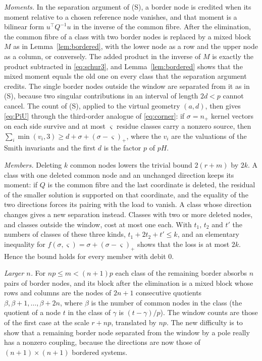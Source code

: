 \documentclass[11pt]{amsart}
\theoremstyle{definition}
\theoremstyle{remark}
\numberwithin{equation}{section}
\begin{document}
\emph{Moments.} In the separation argument of (S), a border node is credited when its moment relative to a chosen
reference node vanishes, and that moment is a bilinear form $u^\top Q^{-1}u$ in the inverse of the common fibre. After the
elimination, the common fibre of a class with two border nodes is replaced by a mixed block $M$ as in
Lemma~\ref{lem:bordered}, with the lower node as a row and the upper node as a column, or conversely. The added product in
the inverse of $M$ is exactly the product subtracted in \eqref{eq:schur3}, and Lemma~\ref{lem:bordered} shows that the
mixed moment equals the old one on every class that the separation argument credits. The single border nodes outside the
window are separated from it as in (S), because two singular contributions in an interval of length $2d<p$ cannot cancel.
The count of (S), applied to the virtual geometry $(a,d)$, then gives \eqref{eq:PiU} through the third-order analogue of
\eqref{eq:corner}: if $\sigma=n_+$ kernel vectors on each side survive and at most $\varsigma$ residue classes carry a
nonzero source, then $\sum_i\min(v_i,3)\ge d+\sigma+(\sigma-\varsigma)_+$, where the $v_i$ are the valuations of the
Smith invariants and the first $d$ is the factor $p$ of $pH$.

\emph{Members.} Deleting $k$ common nodes lowers the trivial bound $2(r+m)$ by $2k$. A class with one deleted common node and
an unchanged direction keeps its moment: if $Q$ is the common fibre and the last coordinate is deleted, the residual of the
smaller solution is supported on that coordinate, and the equality of the two directions forces its pairing with the load to
vanish. A class whose direction changes gives a new separation instead. Classes with two or more deleted nodes, and classes
outside the window, cost at most one each. With $t_1$, $t_2$ and $t'$ the numbers of classes of these three kinds,
$t_1+2t_2+t'\le k$, and an elementary inequality for $f(\sigma,\varsigma)=\sigma+(\sigma-\varsigma)_+$ shows that the loss
is at most $2k$. Hence the bound holds for every member with debit $0$.

\emph{Larger $n$.} For $np\le m<(n+1)p$ each class of the remaining border absorbs $n$ pairs of border nodes, and its block
after the elimination is a mixed block whose rows and columns are the nodes of $2n+1$ consecutive quotients
$\beta,\beta+1,\dots,\beta+2n$, where $\beta$ is the number of common nodes in the class (the quotient of a node $t$ in the
class of $\gamma$ is $(t-\gamma)/p$). The window counts are those of the first case at the scale $r+np$, translated by $np$. The new difficulty is to show that a remaining border node separated from the window
by a pole really has a nonzero coupling, because the directions are now those of $(n+1)\times(n+1)$ bordered systems.
\end{document}
